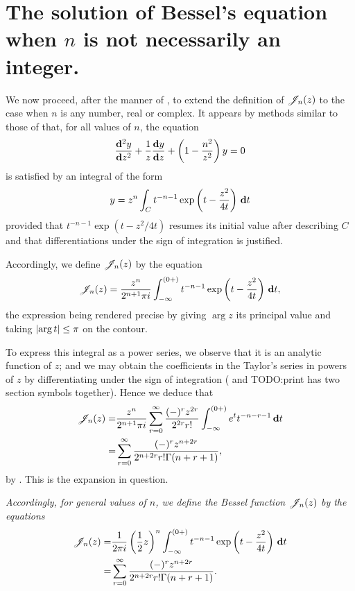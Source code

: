 \documentclass{book}
\begin{document}
\section{The solution of Bessel's equation when $n$ is not necessarily
  an integer.}
We now proceed, after the manner of , to
extend the definition of $\mathscr{J}_n(z)$ to the case when $n$ is any number,
real or complex. It appears by methods similar to those of
 that, for all values of $n$, the
equation
$$
\frac{\mathbf{d}^2 y}{\mathbf{d} z^2}
+ \frac{1}{z} \frac{\mathbf{d} y}{\mathbf{d} z}
+ \left(  1 - \frac{n^2}{z^2}   \right) y
= 0
$$
is satisfied by an integral of the form
$$
y
=
z^n
\int_C
t^{-n-1}
\exp \left(  t - \frac{z^2}{4t}   \right)
\, \mathbf{d} t
$$
provided that $t^{-n-1}\exp(t - z^2/4t)$ resumes its initial value
after describing $C$ and that differentiations under the sign of
integration is justified.

Accordingly, we define $\mathscr{J}_n(z)$ by the equation
$$
\mathscr{J}_n(z) 
= 
\frac{z^n}{2^{n+1}\pi i}
\int_{-\infty}^{(0+)}
t^{-n-1} 
\exp\left(  t - \frac{z^2}{4t}   \right)
\, \mathbf{d} t,
$$
the expression being rendered precise by giving
$\arg z$ its principal value and taking
$\left|  \arg t  \right| \leq \pi$ on the contour.

To express this integral as a power series, we observe that it is an
analytic function of $z$; and we may obtain the coefficients in the
Taylor's series in powers of $z$ by differentiating under the sign of 
integration
( and 
TODO:print has two section symbols together).
Hence we deduce that
\begin{align*}
  \mathscr{J}_n(z)
  =& \frac{z^n}{2^{n+1}\pi i}
  \sum_{r=0}^{\infty} \frac{ (-)^r z^{2r}  }{ 2^{2r} r!  }
  \int_{-\infty}^{(0+)}
  e^t
  t^{-n-r-1}
  \, \mathbf{d} t
  \\
  =&
  \sum_{r=0}^{\infty}
  \frac{ (-)^r z^{n+2r}  }{ 2^{n+2r} r! \Gamma(n+r+1)  },
\end{align*}
by . This is the expansion in question.

% 
% 
\emph{Accordingly, for general values of $n$, we define the
  \emph{Bessel function} $\mathscr{J}_n(z)$ by the equations}
\begin{align*}
  \mathscr{J}_n(z)
  =& \frac{1}{2\pi i} \left( \frac{1}{2} z \right)^n
  \int_{-\infty}^{(0+)}
  t^{-n-1}
  \exp\left(  t - \frac{z^2}{4t}   \right)
  \, \mathbf{d} t
  \\
  =&
  \sum_{r=0}^{\infty}
  \frac{ (-)^r z^{n+2r}  }{ 2^{n+2r} r! \Gamma(n+r+1)  }.
\end{align*}
\end{document}
